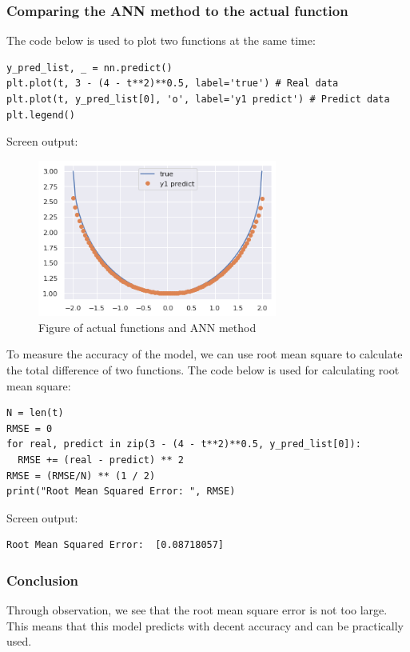 \documentclass[a4paper]{article}
\numberwithin{equation}{section}
\begin{document}
\subsubsection{Comparing the ANN method to the actual function}
The code below is used to plot two functions at the same time:
\begin{mdframed}[leftline=false,rightline=false,backgroundcolor=magenta!10,nobreak=true]
  \begin{verbatim}
y_pred_list, _ = nn.predict()
plt.plot(t, 3 - (4 - t**2)**0.5, label='true') # Real data
plt.plot(t, y_pred_list[0], 'o', label='y1 predict') # Predict data
plt.legend()
    \end{verbatim}
\end{mdframed}
Screen output:
\begin{figure}[H]
  \centering
  \includegraphics[width=0.7\textwidth]{ODEplot.png}
  \caption{Figure of actual functions and ANN method}\label{ODEplot.png}
\end{figure}

To measure the accuracy of the model, we can use root mean square to calculate the total difference of two functions. The code below is used for calculating root mean square:
\begin{mdframed}[leftline=false,rightline=false,backgroundcolor=magenta!10,nobreak=true]
  \begin{verbatim}
N = len(t)
RMSE = 0
for real, predict in zip(3 - (4 - t**2)**0.5, y_pred_list[0]):
  RMSE += (real - predict) ** 2
RMSE = (RMSE/N) ** (1 / 2)
print("Root Mean Squared Error: ", RMSE)
    \end{verbatim}
\end{mdframed}
Screen output:
\begin{mdframed}[leftline=false,rightline=false,backgroundcolor=Turquoise!10,nobreak=true]
  \begin{verbatim}
Root Mean Squared Error:  [0.08718057]
    \end{verbatim}
\end{mdframed}

\subsubsection{Conclusion}
Through observation, we see that the root mean square error is not too large. This means that this model predicts with decent accuracy and can be practically used.


\newpage

\printbibliography[heading=bibintoc]
\end{document}
